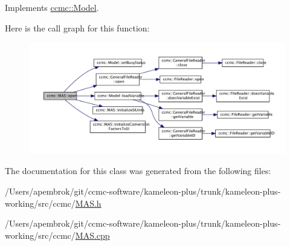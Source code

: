 Implements \hyperlink{classccmc_1_1_model_a3c64dc635c2c1a2fe2f8efa2a3666282}{ccmc\-::\-Model}.



Here is the call graph for this function\-:\nopagebreak
\begin{figure}[H]
\begin{center}
\leavevmode
\includegraphics[width=350pt]{classccmc_1_1_m_a_s_a054e168c8a692b724471c0c3c775dc25_cgraph}
\end{center}
\end{figure}




The documentation for this class was generated from the following files\-:\begin{DoxyCompactItemize}
\item 
/\-Users/apembrok/git/ccmc-\/software/kameleon-\/plus/trunk/kameleon-\/plus-\/working/src/ccmc/\hyperlink{_m_a_s_8h}{M\-A\-S.\-h}\item 
/\-Users/apembrok/git/ccmc-\/software/kameleon-\/plus/trunk/kameleon-\/plus-\/working/src/ccmc/\hyperlink{_m_a_s_8cpp}{M\-A\-S.\-cpp}\end{DoxyCompactItemize}
